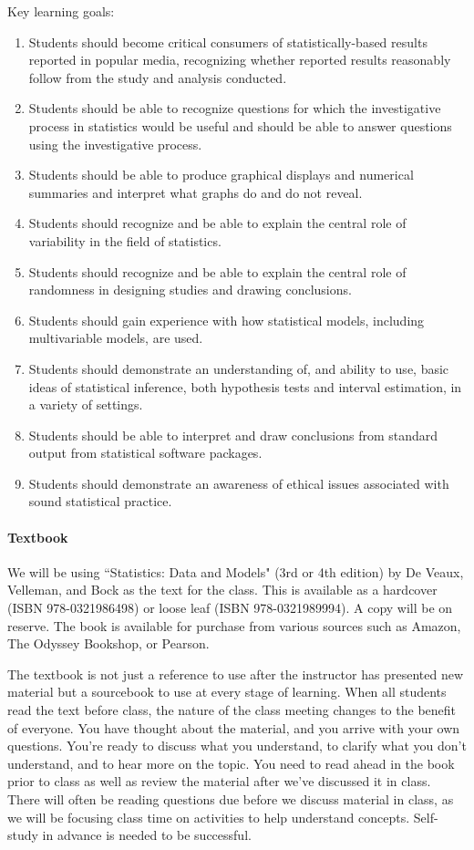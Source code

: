 \documentclass[11pt]{article}
\begin{document}
Key learning goals:
\begin{enumerate}
\item Students should become critical consumers of statistically-based results reported in popular media, recognizing whether reported results reasonably follow from the study and analysis conducted.
\item Students should be able to recognize questions for which the investigative process in statistics would be useful and should be able to answer questions using the investigative process. 
\item Students should be able to produce graphical displays and numerical summaries and interpret what graphs do and do not reveal. 
\item Students should recognize and be able to explain the central role of variability in the field of statistics. 
\item Students should recognize and be able to explain the central role of randomness in designing studies and drawing conclusions.
\item Students should gain experience with how statistical models, including multivariable models, are used.
\item Students should demonstrate an understanding of, and ability to use, basic ideas of statistical inference, both hypothesis tests and interval estimation, in a variety of settings.
\item Students should be able to interpret and draw conclusions from standard output from statistical software packages.
\item Students should demonstrate an awareness of ethical issues associated with sound statistical practice.
\end{enumerate}


\paragraph{Textbook}

We will be using ``Statistics: Data and Models" (3rd or 4th edition) by De Veaux, Velleman, and Bock as the text for the class.  This is available as a 
hardcover (ISBN 978-0321986498) or loose leaf (ISBN 978-0321989994).
A copy will be on reserve.
The book is available for purchase from various sources such as Amazon, The Odyssey Bookshop, or Pearson.

The textbook is not just a reference to use after the instructor has presented new material but a sourcebook to use at every stage of learning.  When all students read the text before class, the nature of the class meeting changes to the benefit of everyone.  You have thought about the material, and you arrive with your own questions.  You're ready to discuss what you understand, to clarify what you don't understand, and to hear more on the topic. You need to read ahead in the book prior to class as well as review the material after we've discussed it in class.  There will often be reading questions due before we discuss material in class, as we will be focusing class time on activities to help understand concepts. 
Self-study in advance is needed to be successful.  
\end{document}
